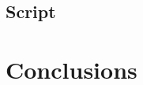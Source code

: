 \documentclass[smallextended,referee]{svjour3}
\begin{document}
\subsection{\textbf{Script}}



\section{Conclusions}

\begin{acknowledgements}

\end{acknowledgements}

\appendix




\end{document}
